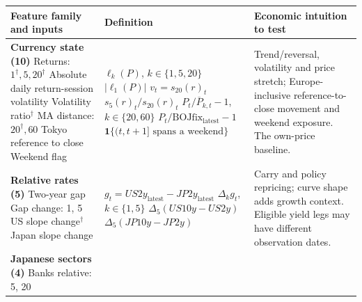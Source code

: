 \documentclass[11pt,a4paper]{article}
\begin{document}
\begingroup\small
\setlength{\tabcolsep}{4pt}\renewcommand{\arraystretch}{1.09}
\begin{tabular}{@{}>{\raggedright\arraybackslash}p{.225\linewidth}>{\raggedright\arraybackslash}p{.445\linewidth}>{\raggedright\arraybackslash}p{.285\linewidth}@{}}
\toprule
Feature family and inputs & Definition & Economic intuition to test\\\midrule
\textbf{Currency state (10)}\newline
Returns: $1^\dagger,5,20^\dagger$\newline
Absolute daily return\newline
20-session volatility\newline
Volatility ratio$^\dagger$\newline
MA distance: $20^\dagger,60$\newline
Tokyo reference to close\newline
Weekend flag
& \mbox{}\newline $\ell_k(P)$, $k\in\{1,5,20\}$\newline
$|\ell_1(P)|$\newline
$v_t=s_{20}(r)_t$\newline
$s_5(r)_t/s_{20}(r)_t$\newline
$P_t/\overline P_{k,t}-1$, $k\in\{20,60\}$\newline
$P_t/\mathrm{BOJfix}_{\mathrm{latest}}-1$\newline
$\mathbf1\{(t,t+1]\text{ spans a weekend}\}$
& Trend/reversal, volatility and price stretch; Europe-inclusive reference-to-close movement and weekend exposure. The own-price baseline.\\[4pt]
\textbf{Relative rates (5)}\newline
Two-year gap\newline
Gap change: 1, 5\newline
US slope change$^\dagger$\newline
Japan slope change
& \mbox{}\newline $g_t=US2y_{\mathrm{latest}}-JP2y_{\mathrm{latest}}$\newline
$\Delta_k g_t$, $k\in\{1,5\}$\newline
$\Delta_5(US10y-US2y)$\newline
$\Delta_5(JP10y-JP2y)$
& Carry and policy repricing; curve shape adds growth context. Eligible yield legs may have different observation dates.\\[4pt]
\textbf{Japanese sectors (4)}\newline
Banks relative: 5, 20\newline

\end{tabular}
\end{document}
